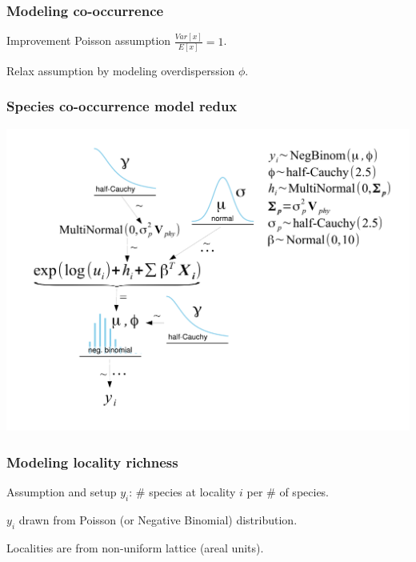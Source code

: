 \documentclass{beamer}
\begin{document}
\begin{frame}
  \frametitle{Modeling co-occurrence}
  \begin{block}{Improvement}
    Poisson assumption \(\frac{Var[x]}{E[x]} = 1\).

    Relax assumption by modeling overdisperssion \(\phi\).
  \end{block}
\end{frame}

\begin{frame}
  \frametitle{Species co-occurrence model redux}
  \begin{center}
    \includegraphics[height = 0.8\textheight, width = \textwidth,  keepaspectratio = true]{figure/mammal_deg_over_model}
  \end{center}
\end{frame}

\begin{frame}
  \frametitle{Modeling locality richness}
  \begin{alertblock}{Assumption and setup}
    \(y_{i}\): \# species at locality \(i\) per \# of species.

    \(y_{i}\) drawn from Poisson (or Negative Binomial) distribution.

    Localities are from non-uniform lattice (areal units).
  \end{alertblock}
\end{frame}
\end{document}
